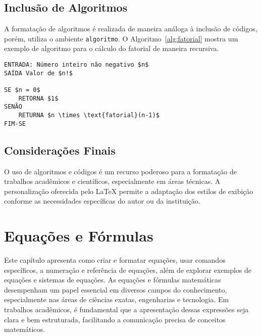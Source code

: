 \documentclass[
    12pt
    ,oneside
    ,a4paper
    ,chapter=TITLE
    ,section=TITLE
    ,sumario=abnt-6027-2012]{abntex2}
\begin{document}
\section{Inclusão de Algoritmos}

A formatação de algoritmos é realizada de maneira análoga à inclusão de códigos, porém, utiliza o ambiente \texttt{algoritmo}. O Algoritmo~\ref{alg:fatorial} mostra um exemplo de algoritmo para o cálculo do fatorial de maneira recursiva.

\begin{algoritmo}
\begin{lstlisting}[mathescape]
ENTRADA: Número inteiro não negativo $n$
SAÍDA Valor de $n!$

SE $n = 0$
    RETORNA $1$
SENÃO
    RETURNA $n \times \text{fatorial}(n-1)$
FIM-SE
\end{lstlisting}
\fonteautor
\end{algoritmo}


\section{Considerações Finais}

O uso de algoritmos e códigos é um recurso poderoso para a formatação de trabalhos acadêmicos e científicos, especialmente em áreas técnicas. A personalização oferecida pelo LaTeX permite a adaptação dos estilos de exibição conforme as necessidades específicas do autor ou da instituição.






\chapter{Equações e Fórmulas}
\label{cap:equacoes}

Este capítulo apresenta como criar e formatar equações, usar comandos específicos, a numeração e referência de equações, além de explorar exemplos de equações e sistemas de equações. As equações e fórmulas matemáticas desempenham um papel essencial em diversos campos do conhecimento, especialmente nas áreas de ciências exatas, engenharias e tecnologia. Em trabalhos acadêmicos, é fundamental que a apresentação dessas expressões seja clara e bem estruturada, facilitando a comunicação precisa de conceitos matemáticos.
\end{document}
